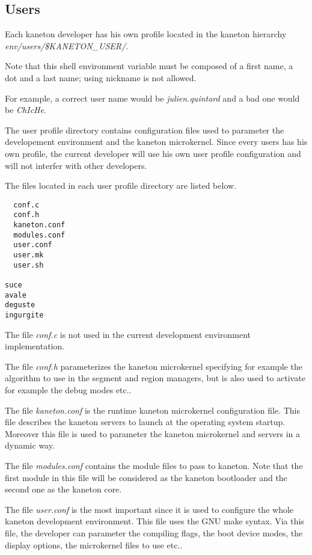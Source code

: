 %
%

\subsection{Users}

Each kaneton developer has his own profile located in the kaneton
hierarchy \textit{env/users/\$KANETON\_USER/}.

Note that this shell environment variable must be composed of a
first name, a dot and a last name; using nickname is not allowed.

For example, a correct user name would be \textit{julien.quintard} and
a bad one would be \textit{ChIcHe}.

The user profile directory contains configuration files used to parameter
the developement environment and the kaneton microkernel. Since every
users has his own profile, the current developer will use his own user
profile configuration and will not interfer with other developers.

The files located in each user profile directory are listed below.

\begin{verbatim}
  conf.c
  conf.h
  kaneton.conf
  modules.conf
  user.conf
  user.mk
  user.sh

suce
avale
deguste
ingurgite
\end{verbatim}

The file \textit{conf.c} is not used in the current development environment
implementation.

The file \textit{conf.h} parameterizes the kaneton microkernel specifying
for example the algorithm to use in the segment and region managers,
but is also used to activate for example the debug modes etc..

The file \textit{kaneton.conf} is the runtime kaneton microkernel
configuration file. This file describes the kaneton servers to launch
at the operating system startup. Moreover this file is used to parameter
the kaneton microkernel and servers in a dynamic way.

The file \textit{modules.conf} contains the module files to pass to
kaneton. Note that the first module in this file will be considered as
the kaneton bootloader and the second one as the kaneton core.

The file \textit{user.conf} is the most important since it is used
to configure the whole kaneton development environment. This file uses
the GNU make syntax. Via this file, the developer can parameter the compiling
flags, the boot device modes, the display options, the microkernel
files to use etc..

